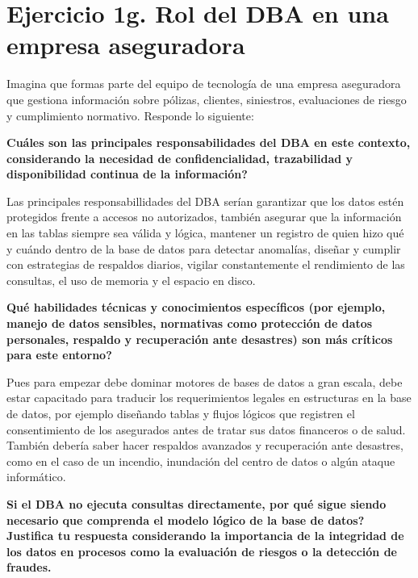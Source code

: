 
\section*{Ejercicio 1g. Rol del DBA en una empresa aseguradora}

Imagina que formas parte del equipo de tecnología de una empresa aseguradora que gestiona información sobre pólizas, clientes, siniestros, evaluaciones de riesgo y cumplimiento normativo. Responde lo siguiente:

\textbf{Cuáles son las principales responsabilidades del DBA en este contexto, considerando la necesidad de confidencialidad, trazabilidad y disponibilidad continua de la información?}


Las principales responsabillidades del DBA serían garantizar que los datos estén protegidos frente a accesos no autorizados, también asegurar que la información en las tablas siempre sea válida y lógica, mantener un registro de quien hizo qué y cuándo dentro de la base de datos para detectar anomalías, diseñar y cumplir con estrategias de respaldos diarios, vigilar constantemente el rendimiento de las consultas, el uso de memoria y el espacio en disco.

\textbf{Qué habilidades técnicas y conocimientos específicos (por ejemplo, manejo de datos sensibles, normativas como protección de datos personales, respaldo y recuperación ante desastres) son más críticos para este entorno?}


Pues para empezar debe dominar motores de bases de datos a gran escala, debe estar capacitado para traducir los requerimientos legales en estructuras en la base de datos, por ejemplo diseñando tablas y flujos lógicos que registren el consentimiento de los asegurados antes de tratar sus datos financeros o de salud. También debería saber hacer respaldos avanzados y recuperación ante desastres, como en el caso de un incendio, inundación del centro de datos o algún ataque informático.


\textbf{Si el DBA no ejecuta consultas directamente, por qué sigue siendo necesario que comprenda el modelo lógico de la base de datos? Justifica tu respuesta considerando la importancia de la integridad de los datos en procesos como la evaluación de riesgos o la detección de fraudes.}



